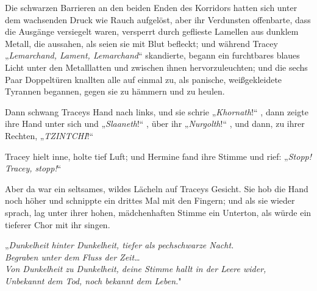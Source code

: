 Die schwarzen Barrieren an den beiden Enden des Korridors hatten sich unter dem wachsenden Druck wie Rauch aufgelöst, aber ihr Verdunsten offenbarte, dass die Ausgänge versiegelt waren, versperrt durch geflieste Lamellen aus dunklem Metall, die aussahen, als seien sie mit Blut befleckt; und während Tracey „\emph{Lemarchand, Lament, Lemarchand}“ skandierte, begann ein furchtbares blaues Licht unter den Metalllatten und zwischen ihnen hervorzuleuchten; und die sechs Paar Doppeltüren knallten alle auf einmal zu, als panische, weißgekleidete Tyrannen begannen, gegen sie zu hämmern und zu heulen.

Dann schwang Traceys Hand nach links, und sie schrie „\emph{Khornath}!“ , dann zeigte ihre Hand unter sich und „\emph{Slaaneth}!“ , über ihr „\emph{Nurgolth}!“ , und dann, zu ihrer Rechten, „\emph{TZINTCHI}!“

Tracey hielt inne, holte tief Luft; und Hermine fand ihre Stimme und rief: „\emph{Stopp! Tracey, stopp!}“

Aber da war ein seltsames, wildes Lächeln auf Traceys Gesicht. Sie hob die Hand noch höher und schnippte ein drittes Mal mit den Fingern; und als sie wieder sprach, lag unter ihrer hohen, mädchenhaften Stimme ein Unterton, als würde ein tieferer Chor mit ihr singen.

„\emph{Dunkelheit hinter Dunkelheit, tiefer als pechschwarze Nacht.\\
Begraben unter dem Fluss der Zeit…\\
Von Dunkelheit zu Dunkelheit, deine Stimme hallt in der Leere wider,\\
Unbekannt dem Tod, noch bekannt dem Leben.}"

